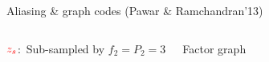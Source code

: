 \documentclass[10pt,xcolor=table]{beamer}
\begin{document}
\begin{frame}{Aliasing \& graph codes (Pawar \& Ramchandran'13)}
\begin{columns}
\begin{block}{{\small$\color{red}z_s$:\ Sub-sampled by $f_2=P_2=3$}}
				\begin{figure}[t]
					\begin{center}
						\resizebox{1.0\textwidth}{!}{}
					\end{center}
				\end{figure}
			\end{block}
			\pause

			\begin{block}{\small Factor graph}
				\begin{figure}[t]
					\begin{center}
						\resizebox{1.0\textwidth}{!}{}
					\end{center}
				\end{figure}

			\end{block}
		\end{columns}
	\end{frame}
\end{document}
